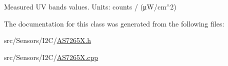 Measured UV bands values. Units\+: counts / (μ\+W/cm$^\wedge$2) 



The documentation for this class was generated from the following files\+:\begin{DoxyCompactItemize}
\item 
src/\+Sensors/\+I2\+C/\hyperlink{_a_s7265_x_8h}{A\+S7265\+X.\+h}\item 
src/\+Sensors/\+I2\+C/\hyperlink{_a_s7265_x_8cpp}{A\+S7265\+X.\+cpp}\end{DoxyCompactItemize}
